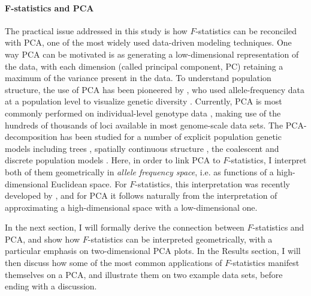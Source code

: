 \documentclass[12pt,fullpage, a4paper]{article}
\begin{document}
\paragraph{F-statistics and PCA}
The practical issue addressed in this study is how $F$-statistics can be reconciled with PCA, one of the most widely used data-driven modeling  techniques. One way PCA can be motivated is as generating a low-dimensional representation of the data, with each dimension (called principal component, PC) retaining a maximum of the variance present in the data. To understand population structure, the use of PCA has been pioneered by \cite{cavalli-sforza1964}, who used allele-frequency data at a population level to visualize genetic diversity \citep{cavalli-sforza1994}. Currently, PCA is most commonly performed on individual-level genotype data \citep[e.g.][]{patterson2006, novembre2008}, making use of the hundreds of thousands of loci available in most genome-scale data sets. 
The PCA-decomposition has been studied for a number of explicit population genetic models including trees \citep{cavalli-sforza1975}, spatially continuous structure \citep{novembre2008a}, the coalescent \citep{mcvean2009} and discrete population models \citep{francois2021}. Here, in order to link PCA to $F$-statistics, I interpret both of them geometrically in \emph{allele frequency space}, i.e. as functions of a high-dimensional Euclidean space. For $F$-statistics, this interpretation was recently developed by \cite{oteo-garcia2021}, and for PCA it follows naturally from the interpretation of approximating a high-dimensional space with a low-dimensional one.

In the next section, I will formally derive the connection between $F$-statistics and PCA, and show how $F$-statistics can be interpreted geometrically, with a particular emphasis on two-dimensional PCA plots. In the Results section, I will then discuss how some of the most common applications of $F$-statistics manifest themselves on a PCA, and illustrate them on two example data sets, before ending with a discussion.
\end{document}
